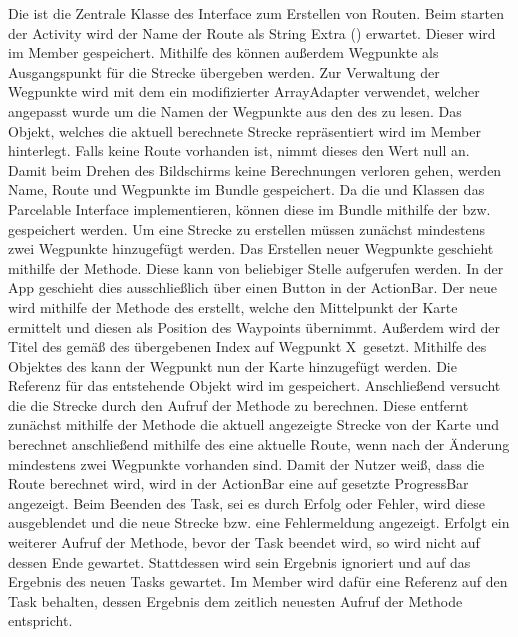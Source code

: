 Die  ist die Zentrale Klasse des Interface zum Erstellen von Routen. Beim starten der Activity wird der Name der Route als String Extra () erwartet. Dieser wird im Member  gespeichert. Mithilfe des  können außerdem Wegpunkte als Ausgangspunkt für die Strecke übergeben werden. Zur Verwaltung der Wegpunkte wird mit dem  ein modifizierter ArrayAdapter verwendet, welcher angepasst wurde um die Namen der Wegpunkte aus den  des  zu lesen. Das  Objekt, welches die aktuell berechnete Strecke repräsentiert wird im Member  hinterlegt. Falls keine Route vorhanden ist, nimmt dieses den Wert null an. Damit beim Drehen des Bildschirms keine Berechnungen verloren gehen, werden Name, Route und Wegpunkte im Bundle gespeichert. Da die  und  Klassen das Parcelable Interface implementieren, können diese im Bundle mithilfe der  bzw.  gespeichert werden. Um eine Strecke zu erstellen müssen zunächst mindestens zwei Wegpunkte hinzugefügt werden. Das Erstellen neuer Wegpunkte geschieht mithilfe der  Methode. Diese kann von beliebiger Stelle aufgerufen werden. In der App geschieht dies ausschließlich über einen Button in der ActionBar. Der neue  wird mithilfe der  Methode des  erstellt, welche den Mittelpunkt der Karte ermittelt und diesen als Position des Waypoints übernimmt. Außerdem wird der Titel des  gemäß des übergebenen Index auf \glqq Wegpunkt X\grqq\ gesetzt. Mithilfe des  Objektes des  kann der Wegpunkt nun der Karte hinzugefügt werden. Die Referenz für das entstehende  Objekt wird im  gespeichert. Anschließend versucht die  die Strecke durch den Aufruf der  Methode zu berechnen. Diese entfernt zunächst mithilfe der  Methode die aktuell angezeigte Strecke von der Karte und berechnet anschließend mithilfe des  eine aktuelle Route, wenn nach der Änderung mindestens zwei Wegpunkte vorhanden sind. Damit der Nutzer weiß, dass die Route berechnet wird, wird in der ActionBar eine auf  gesetzte ProgressBar angezeigt. Beim Beenden des Task, sei es durch Erfolg oder Fehler, wird diese ausgeblendet und die neue Strecke bzw. eine Fehlermeldung angezeigt. Erfolgt ein weiterer Aufruf der Methode, bevor der Task beendet wird, so wird nicht auf dessen Ende gewartet. Stattdessen wird sein Ergebnis ignoriert und auf das Ergebnis des neuen Tasks gewartet. Im Member  wird dafür eine Referenz auf den Task behalten, dessen Ergebnis dem zeitlich neuesten Aufruf der  Methode entspricht. 

